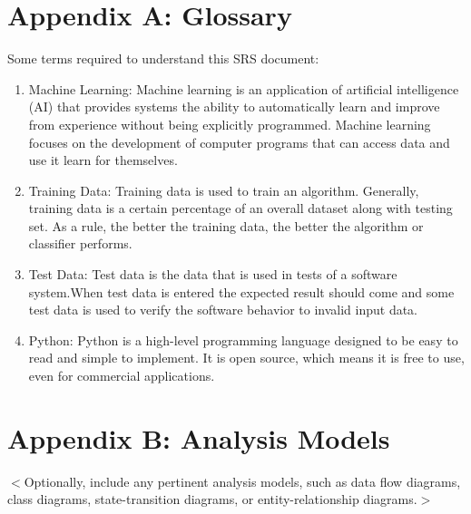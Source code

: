 \documentclass{scrreprt}
\begin{document}
\section{Appendix A: Glossary}
Some terms required to understand this SRS document: 
\begin{enumerate}
\item Machine Learning: Machine learning is an application of artificial intelligence (AI) that provides systems the ability to automatically learn and improve from experience without being explicitly programmed. Machine learning focuses on the development of computer programs that can access data and use it learn for themselves.
\item Training Data: Training data is used to train an algorithm. Generally, training data is a certain percentage of an overall dataset along with testing set. As a rule, the better the training data, the better the algorithm or classifier performs.
\item Test Data: Test data is the data that is used in tests of a software system.When test data is entered the expected result should come and some test data is used to verify the software behavior to invalid input data.
\item Python: Python is a high-level programming language designed to be easy to read and simple to implement. It is open source, which means it is free to use, even for commercial applications.
\end{enumerate}

\section{Appendix B: Analysis Models}
$<$Optionally, include any pertinent analysis models, such as data flow 
diagrams, class diagrams, state-transition diagrams, or entity-relationship 
diagrams.$>$
\end{document}
